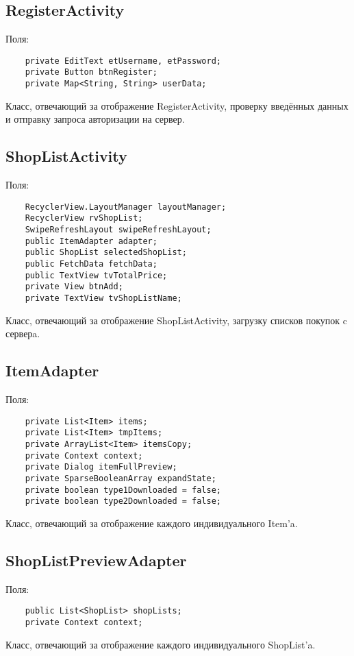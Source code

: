 \subsection{RegisterActivity}
Поля:\\
\begin{small}
    \begin{verbatim}
    private EditText etUsername, etPassword;
    private Button btnRegister;
    private Map<String, String> userData;
    \end{verbatim}
\end{small}
Класс, отвечающий за отображение RegisterActivity, проверку введённых данных и отправку запроса авторизации на сервер.

\subsection{ShopListActivity}
Поля:\\
\begin{small}
    \begin{verbatim}
    RecyclerView.LayoutManager layoutManager;
    RecyclerView rvShopList;
    SwipeRefreshLayout swipeRefreshLayout;
    public ItemAdapter adapter;
    public ShopList selectedShopList;
    public FetchData fetchData;
    public TextView tvTotalPrice;
    private View btnAdd;
    private TextView tvShopListName;
    \end{verbatim}
\end{small}
Класс, отвечающий за отображение ShopListActivity, загрузку списков покупок c серверa.


\subsection{ItemAdapter}
Поля:\\
\begin{small}
    \begin{verbatim}
    private List<Item> items;
    private List<Item> tmpItems;
    private ArrayList<Item> itemsCopy;
    private Context context;
    private Dialog itemFullPreview;
    private SparseBooleanArray expandState;
    private boolean type1Downloaded = false;
    private boolean type2Downloaded = false;
        \end{verbatim}
\end{small}
Класс, отвечающий за отображение каждого индивидуального Item'a.

\subsection{ShopListPreviewAdapter}
 Поля:\\
\begin{small}
    \begin{verbatim}
    public List<ShopList> shopLists;
    private Context context;
    \end{verbatim}
\end{small}
Класс, отвечающий за отображение каждого индивидуального ShopList'a.

